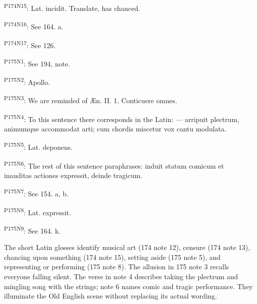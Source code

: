 \textsuperscript{P174N15}: Lat. incidit. Translate, has chanced.

\textsuperscript{P174N16}: See 164. a.

\textsuperscript{P174N17}: See 126.

\textsuperscript{P175N1}: See 194, note.

\textsuperscript{P175N2}: Apollo.

\textsuperscript{P175N3}: We are reminded of Æn. II. 1, Conticuere omnes.

\textsuperscript{P175N4}: To this sentence there corresponds in the Latin: — arripuit plectrum, animumque accommodat arti; cum chordis miscetur vox cantu modulata.

\textsuperscript{P175N5}: Lat. deponens.

\textsuperscript{P175N6}: The rest of this sentence paraphrases: induit statum comicum et inauditas actiones expressit, deinde tragicum.

\textsuperscript{P175N7}: See 154. a, b.

\textsuperscript{P175N8}: Lat. expressit.

\textsuperscript{P175N9}: See 164. k.

The short Latin glosses identify musical art (174 note 12), censure (174 note 13), chancing upon something (174 note 15), setting aside (175 note 5), and representing or performing (175 note 8). The allusion in 175 note 3 recalls everyone falling silent. The verse in note 4 describes taking the plectrum and mingling song with the strings; note 6 names comic and tragic performance. They illuminate the Old English scene without replacing its actual wording.

\endgroup

